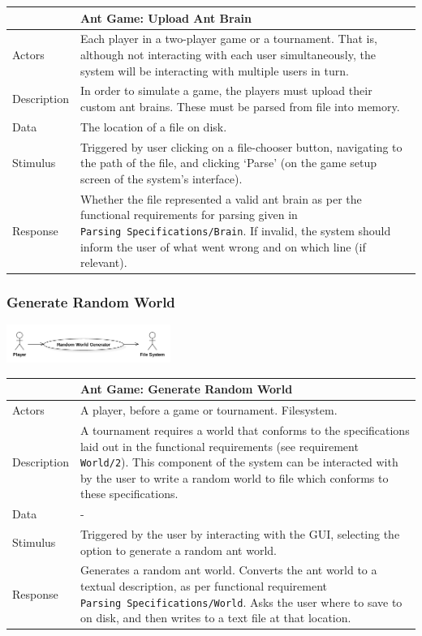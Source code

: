 \documentclass[11pt]{article}
\begin{document}
\begin{longtable}[c]{@{}p{}p{}@{}}
\toprule
& Ant Game: Upload Ant Brain\tabularnewline
\midrule

Actors & Each player in a two-player game or a tournament. That is,
although not interacting with each user simultaneously, the system will
be interacting with multiple users in turn.\tabularnewline
Description & In order to simulate a game, the players must upload their
custom ant brains. These must be parsed from file into
memory.\tabularnewline
Data & The location of a file on disk.\tabularnewline
Stimulus & Triggered by user clicking on a file-chooser button,
navigating to the path of the file, and clicking `Parse' (on the game
setup screen of the system's interface).\tabularnewline
Response & Whether the file represented a valid ant brain as per the
functional requirements for parsing given in
\texttt{Parsing\ Specifications/Brain}. If invalid, the system should
inform the user of what went wrong and on which line (if
relevant).\tabularnewline
\bottomrule
\end{longtable}

\subsubsection{Generate Random World}\label{generate-random-world}

\begin{center}
\includegraphics[width=0.4\textwidth]{diagrams/use-case-2-generate-random-world.png}
\end{center}

\begin{longtable}[c]{@{}p{}p{}@{}}
\toprule
& Ant Game: Generate Random World\tabularnewline
\midrule

Actors & A player, before a game or tournament.
Filesystem.\tabularnewline
Description & A tournament requires a world that conforms to the
specifications laid out in the functional requirements (see requirement
\texttt{World/2}). This component of the system can be interacted with
by the user to write a random world to file which conforms to these
specifications.\tabularnewline
Data & -\tabularnewline
Stimulus & Triggered by the user by interacting with the GUI, selecting
the option to generate a random ant world.\tabularnewline
Response & Generates a random ant world. Converts the ant world to a
textual description, as per functional requirement
\texttt{Parsing\ Specifications/World}. Asks the user where to save to
on disk, and then writes to a text file at that location.\tabularnewline
\bottomrule
\end{longtable}
\end{document}
